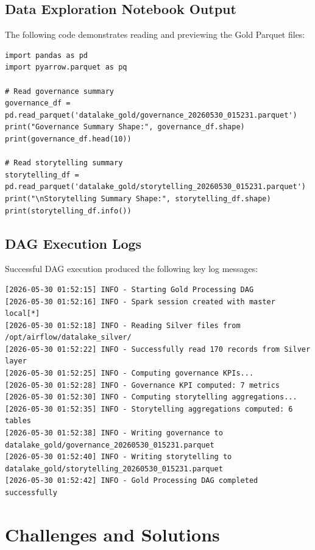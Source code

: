 \documentclass[12pt]{article}
\begin{document}
\subsection{Data Exploration Notebook Output}

The following code demonstrates reading and previewing the Gold Parquet files:

\begin{lstlisting}[caption=Reading Gold Parquet Files]
import pandas as pd
import pyarrow.parquet as pq

# Read governance summary
governance_df = pd.read_parquet('datalake_gold/governance_20260530_015231.parquet')
print("Governance Summary Shape:", governance_df.shape)
print(governance_df.head(10))

# Read storytelling summary
storytelling_df = pd.read_parquet('datalake_gold/storytelling_20260530_015231.parquet')
print("\nStorytelling Summary Shape:", storytelling_df.shape)
print(storytelling_df.info())
\end{lstlisting}

\subsection{DAG Execution Logs}

Successful DAG execution produced the following key log messages:

\begin{verbatim}
[2026-05-30 01:52:15] INFO - Starting Gold Processing DAG
[2026-05-30 01:52:16] INFO - Spark session created with master local[*]
[2026-05-30 01:52:18] INFO - Reading Silver files from /opt/airflow/datalake_silver/
[2026-05-30 01:52:22] INFO - Successfully read 170 records from Silver layer
[2026-05-30 01:52:25] INFO - Computing governance KPIs...
[2026-05-30 01:52:28] INFO - Governance KPI computed: 7 metrics
[2026-05-30 01:52:30] INFO - Computing storytelling aggregations...
[2026-05-30 01:52:35] INFO - Storytelling aggregations computed: 6 tables
[2026-05-30 01:52:38] INFO - Writing governance to datalake_gold/governance_20260530_015231.parquet
[2026-05-30 01:52:40] INFO - Writing storytelling to datalake_gold/storytelling_20260530_015231.parquet
[2026-05-30 01:52:42] INFO - Gold Processing DAG completed successfully
\end{verbatim}

\newpage

\section{Challenges and Solutions}
\label{sec:challenges_solutions}
\end{document}
